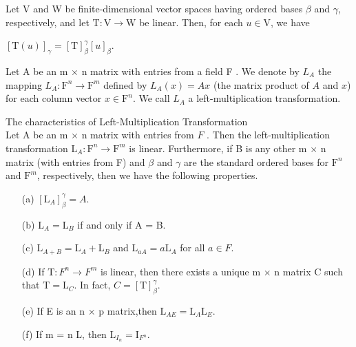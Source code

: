 \begin{thm*}[2.14] $ $\\
	Let V and W be finite-dimensional vector spaces having ordered bases $\beta$ and $\gamma$, respectively, and let $\mathrm{T} : \mathrm{V} \rightarrow \mathrm{W}$ be linear. Then, for each $u \in \mathrm{V}$, we have
	\begin{center}
		$[\mathrm{T}(u)]_\gamma = [\mathrm{T}]^\gamma_\beta[u]_\beta$.
	\end{center}

\end{thm*}

\begin{defn}$ $\\
Let A be an m $\times$ n matrix with entries from a field F . We denote by $L_A$ the mapping $L_A : \mathrm{F}^n \rightarrow \mathrm{F}^m$ defined by $L_A(x) = Ax$ (the matrix product of $A$ and $x$) for each column vector $x \in \mathrm{F}^n$. We call $L_A$ a left-multiplication transformation.	
\end{defn}

\newpage

\begin{thm*}[2.15]
	The characteristics of Left-Multiplication Transformation $ $\\
	Let A be an m $\times$ n matrix with entries from $F$ . Then the left-multiplication transformation $\mathrm{L}_A : \mathrm{F}^n \rightarrow \mathrm{F}^m$ is linear. Furthermore, if B is any other m $\times$ n matrix (with entries from F) and $\beta$ and $\gamma$ are the standard ordered bases for $\mathrm{F}^n$ and $\mathrm{F}^m$, respectively, then we have the following properties.
	
	\begin{enumerate}
	
		\item [(a)] $[\mathrm{L}_A]^\gamma_\beta = A$.
		\item [(b)] $\mathrm{L}_A = \mathrm{L}_B$ if and only if A = B.
		\item [(c)] $\mathrm{L}_{A+B} = \mathrm{L}_A + \mathrm{L}_B$ and $\mathrm{L}_{aA} = a\mathrm{L}_A$ for all $a \in F$.
		\item [(d)]  If $\mathrm{T} : F^n \rightarrow F^m$ is linear, then there exists a unique m $\times$ n matrix C such
that $\mathrm{T} = \mathrm{L}_C$. In fact, $C = [\mathrm{T}]^\gamma_\beta$.
		\item [(e)] If E is an n $\times$ p matrix,then $\mathrm{L}_{AE} = \mathrm{L}_A\mathrm{L}_E$.
		\item [(f)] If m = n L, then $\mathrm{L}_{I_n} =\mathrm{I}_{F^n}$.
	
	\end{enumerate}

\end{thm*}

